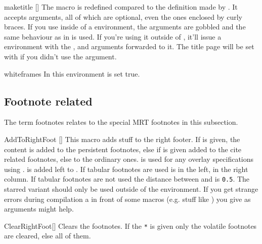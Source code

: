 \begin{describemacro}{maketitle}
  []
  The  macro is redefined compared to the definition made by
  . It accepts arguments, all of which are optional, even the ones
  enclosed by curly braces. If you use  inside of a 
  environment, the arguments are gobbled and the same behaviour as in
   is used. If you're using it outside of , it'll issue a
   environment with the ,  and
   arguments forwarded to it. The title page will be set with
   if you didn't use the  argument.
\end{describemacro}

\begin{describeenv}{whiteframes}
  In this environment  is set true.
\end{describeenv}

\subsection{Footnote related}\label{sec:beam:macros:foot}
The term footnotes relates to the special MRT footnotes in this subsection.
\begin{describemacro}{AddToRightFoot}%
  [\meta{*}\meta{+}]
  This macro adds stuff to the right footer. If \meta{*} is given, the content
  is added to the persistent footnotes, else if \meta{+} is given added to the
  cite related footnotes, else to the ordinary ones.  is used for
  any overlay specifications using .  is added left to
  . If tabular footnotes are used  is in the left,
   in the right column. If tabular footnotes are not used the
  distance between  and  is \texttt{0.5}. The
  starred variant should only be used outside of the  environment. If
  you get strange errors during compilation a  in front of some
  macros (e.g. stuff like ) you give as arguments might help.
\end{describemacro}

\begin{describemacro}{ClearRightFoot}[\meta{*}]
  Clears the footnotes. If the \texttt{*} is given only the volatile footnotes
  are cleared, else all of them.
\end{describemacro}

